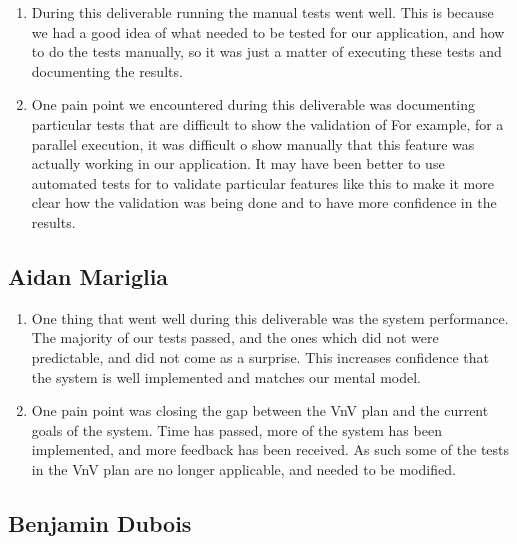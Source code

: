 \documentclass[12pt, titlepage]{article}
\begin{document}
\begin{enumerate}
    \item During this deliverable running the manual tests went well. This is because we had a good idea of what needed to be tested for our application, and how to do the tests manually, so it was just a matter of executing these tests and documenting the results.
    \item One pain point we encountered during this deliverable was documenting particular tests that are difficult to show the validation of For example, for a parallel execution, it was difficult o show manually that this feature was actually working in our application. It may have been better to use automated tests for to validate particular features like this to make it more clear how the validation was being done and to have more confidence in the results.
\end{enumerate}  

\subsection*{Aidan Mariglia}

\begin{enumerate}
    \item One thing that went well during this deliverable was the system performance. The majority of our tests passed, and the ones which did not were predictable, and did not come as a surprise. This increases confidence that the system is well implemented and matches our mental model.
    \item One pain point was closing the gap between the VnV plan and the current goals of the system. Time has passed, more of the system has been implemented, and more feedback has been received. As such some of the tests in the VnV plan are no longer applicable, and needed to be modified. 

\end{enumerate}  

\subsection*{Benjamin Dubois}
\end{document}
